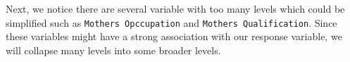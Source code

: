 \documentclass[
]{article}
\newenvironment{Shaded}{\begin{snugshade}}{\end{snugshade}}
\newcommand{\AttributeTok}[1]{\textcolor[rgb]{0.13,0.29,0.53}{#1}}
\newcommand{\DecValTok}[1]{\textcolor[rgb]{0.00,0.00,0.81}{#1}}
\newcommand{\FunctionTok}[1]{\textcolor[rgb]{0.13,0.29,0.53}{\textbf{#1}}}
\newcommand{\NormalTok}[1]{#1}
\newcommand{\OtherTok}[1]{\textcolor[rgb]{0.56,0.35,0.01}{#1}}
\newcommand{\SpecialCharTok}[1]{\textcolor[rgb]{0.81,0.36,0.00}{\textbf{#1}}}
\newcommand{\StringTok}[1]{\textcolor[rgb]{0.31,0.60,0.02}{#1}}
\begin{document}
Next, we notice there are several variable with too many levels which
could be simplified such as
\texttt{Mother\textquotesingle{}s\ Opccupation} and
\texttt{Mother\textquotesingle{}s\ Qualification}. Since these variables
might have a strong association with our response variable, we will
collapse many levels into some broader levels.

\begin{Shaded}
\end{Shaded}
\end{document}
